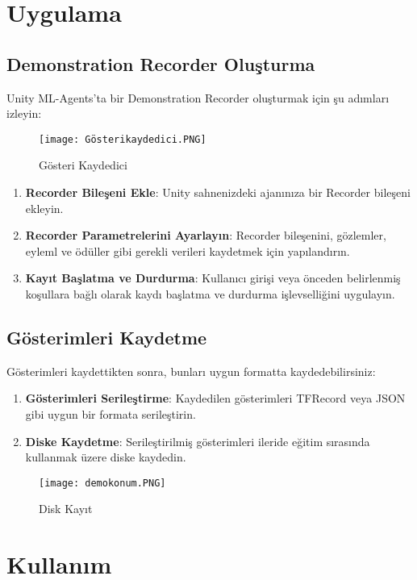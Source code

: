 \documentclass{article}
\begin{document}
\section{Uygulama}

\subsection{Demonstration Recorder Oluşturma}
Unity ML-Agents'ta bir Demonstration Recorder oluşturmak için şu adımları izleyin:
\begin{figure}[h]
    \centering
    \texttt{[image: Gösterikaydedici.PNG]}
    \caption{Gösteri Kaydedici}
    \label{fig:resim22}
    \end{figure}
\begin{enumerate}
\item \textbf{Recorder Bileşeni Ekle}: Unity sahnenizdeki ajanınıza bir Recorder bileşeni ekleyin.
\item \textbf{Recorder Parametrelerini Ayarlayın}: Recorder bileşenini, gözlemler, eyleml ve ödüller gibi gerekli verileri kaydetmek için yapılandırın.
\item \textbf{Kayıt Başlatma ve Durdurma}: Kullanıcı girişi veya önceden belirlenmiş koşullara bağlı olarak kaydı başlatma ve durdurma işlevselliğini uygulayın.
\end{enumerate}

\subsection{Gösterimleri Kaydetme}
Gösterimleri kaydettikten sonra, bunları uygun formatta kaydedebilirsiniz:

\begin{enumerate}
\item \textbf{Gösterimleri Serileştirme}: Kaydedilen gösterimleri TFRecord veya JSON gibi uygun bir formata serileştirin.
\item \textbf{Diske Kaydetme}: Serileştirilmiş gösterimleri ileride eğitim sırasında kullanmak üzere diske kaydedin.
\end{enumerate}
\begin{figure}[h]
    \centering
    \texttt{[image: demokonum.PNG]}
    \caption{Disk Kayıt}
    \label{fig:resim23}
    \end{figure}
\section{Kullanım}
\end{document}
